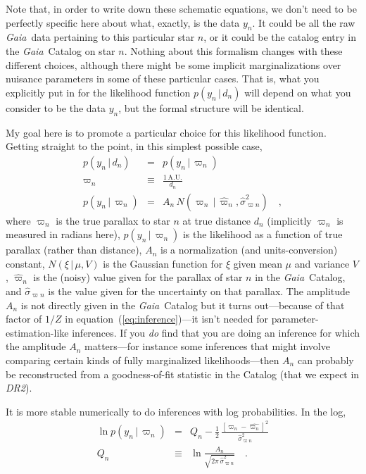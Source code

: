 \documentclass[12pt, modern]{aastex62}
\newcommand{\acronym}[1]{{\small{#1}}}
\newcommand{\Gaia}{\textsl{Gaia}}
\newcommand{\DRtwo}{\textsl{\acronym{DR2}}}
\newcommand{\equationname}{equation}
\newcommand{\AU}{\mathrm{A.U.}}
\newcommand{\given}{\,|\,}
\begin{document}
Note that, in order to write down these schematic equations,
we don't need to be perfectly specific here about what, exactly,
is the data $y_n$.
It could be all the raw \Gaia\ data pertaining to this particular star $n$,
or it could be the catalog entry in the \Gaia\ Catalog on star $n$.
Nothing about this formalism changes with these different choices,
although there might be some implicit marginalizations over nuisance
parameters in some of these particular cases.
That is, what you explicitly put in for the likelihood function $p(y_n\given d_n)$
will depend on what you consider to be the data $y_n$, but the formal structure
will be identical.

My goal here is to promote a particular choice for this likelihood function.
Getting straight to the point, in this simplest possible case, 
\begin{eqnarray}
p(y_n\given d_n) &=& p(y_n\given\varpi_n)
\label{eq:gotoparallax}
\\
\varpi_n &\equiv& \frac{1\,\AU}{d_n}
\\
p(y_n\given\varpi_n) &=& A_n\,N(\varpi_n\given\hat{\varpi}_n,\hat{\sigma}^2_{\varpi n})
\label{eq:onedlike}
\quad ,
\end{eqnarray}
where
$\varpi_n$ is the true parallax to star $n$ at true distance $d_n$ (implicitly $\varpi_n$ is measured in radians here),
$p(y_n\given\varpi_n)$ is the likelihood as a function of true parallax (rather than distance),
$A_n$ is a normalization (and units-conversion) constant,
$N(\xi\given\mu,V)$ is the Gaussian function for $\xi$ given mean $\mu$ and variance $V$,
$\hat{\varpi}_n$ is the (noisy) value given for the parallax of star $n$ in the \Gaia\ Catalog,
and $\hat{\sigma}_{\varpi n}$ is the value given for the uncertainty on that parallax.
The amplitude $A_n$ is not directly given in the \Gaia\ Catalog
but it turns out---because of that factor of $1/Z$ in
\equationname~(\ref{eq:inference})---it isn't needed for parameter-estimation-like
inferences.
If you \emph{do} find that you are doing an inference for which the amplitude
$A_n$ matters---for instance some inferences that might involve comparing certain
kinds of fully marginalized likelihoods---then $A_n$ can probably be reconstructed
from a goodness-of-fit statistic in the Catalog (that we expect in \DRtwo).

It is more stable numerically to do inferences with log probabilities.
In the log,
\begin{eqnarray}
\ln p(y_n\given\varpi_n) &=& Q_n - \frac{1}{2}\,\frac{[\varpi_n - \hat{\varpi_n}]^2}{\hat{\sigma}^2_{\varpi n}}
\\
Q_n &\equiv& \ln\frac{A_n}{\sqrt{2\pi\,\hat{\sigma}^2_{\varpi n}}}
\quad .
\end{eqnarray}
\end{document}
